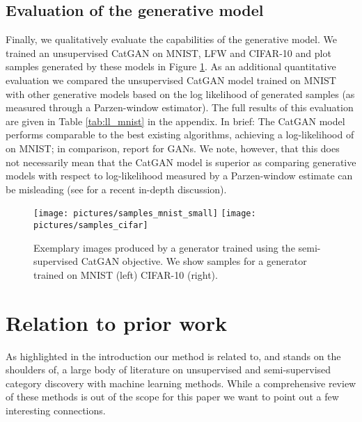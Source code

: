 \documentclass{article} \usepackage{iclr2016_conference,times}
\begin{document}
\subsection{Evaluation of the generative model}
Finally, we qualitatively evaluate the capabilities of the generative model. We
trained an unsupervised CatGAN on MNIST,
LFW and CIFAR-10 and plot samples generated by these models in Figure
\ref{fig:samples_lfw}. As an additional quantitative evaluation we
compared the unsupervised CatGAN model trained on MNIST with other
generative models based on the log likelihood of generated samples (as
measured through a Parzen-window estimator). The full results of this
evaluation are given in Table \ref{tab:ll_mnist} in the appendix. In
brief: The CatGAN model performs comparable to the best existing
algorithms, achieving a log-likelihood of  on MNIST; in
comparison, \citet{Goodfellow_NIPS2014} report  for GANs.
We note, however, that this does not necessarily mean that the CatGAN
model is superior as comparing generative models with respect to
log-likelihood measured by a Parzen-window estimate can be misleading
(see \cite{Theis_2015} for a recent in-depth discussion).

\begin{figure}[t]
  \centering
  \texttt{[image: pictures/samples\_mnist\_small]}
  \texttt{[image: pictures/samples\_cifar]}
  \caption{Exemplary images produced by a generator trained using the
    semi-supervised CatGAN objective. We show samples for a generator
    trained on MNIST (left) CIFAR-10 (right).}
  \label{fig:samples_lfw}
\end{figure}

\section{Relation to prior work}
\label{sect:prior_work}
As highlighted in the introduction our method is related to, and
stands on the shoulders of, a large body of literature on unsupervised
and semi-supervised category discovery with machine learning
methods. While a comprehensive review of these methods is out of the
scope for this paper we want to point out a few interesting connections. 
\end{document}
